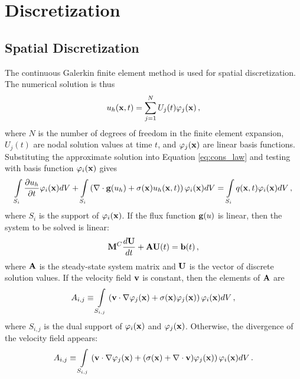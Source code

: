 \section{Discretization}
\subsection{Spatial Discretization}\label{galerkindef}
The continuous Galerkin finite element method is used for spatial discretization.
The numerical solution is thus
\begin{equation}
   u_h(\mathbf{x},t) = \sum\limits_{j=1}^N U_j(t) \varphi_j(\mathbf{x}) \,,
\end{equation}
where $N$ is the number of degrees of freedom in the finite element expansion,
$U_j(t)$ are nodal solution values at time $t$, and $\varphi_j(\mathbf{x})$
are linear basis functions. Substituting the approximate solution into
Equation \eqref{eq:cons_law} and testing
with basis function $\varphi_i(\mathbf{x})$ gives
\begin{equation}
   \int\limits_{S_i}\frac{\partial u_h}{\partial t}\varphi_i(\mathbf{x}) dV
      + \int\limits_{S_i}\left(\nabla\cdot\mathbf{g}(u_h)
      + \sigma(\mathbf{x})u_h(\mathbf{x},t)\right)\varphi_i(\mathbf{x}) dV
      = \int\limits_{S_i} q(\mathbf{x},t) \varphi_i(\mathbf{x}) dV \,,
\end{equation}
where $S_i$ is the support of $\varphi_i(\mathbf{x})$. If the flux function
$\mathbf{g}(u)$ is linear, then the system to be solved is linear:
\begin{equation}\label{semidiscrete}
   \mathbf{M}^C\frac{d\mathbf{U}}{dt}+\mathbf{A} \mathbf{U}(t) = \mathbf{b}(t) \,,
\end{equation}
where $\mathbf{A}$ is the steady-state system matrix and $\mathbf{U}$ is the
vector of discrete solution values. If the velocity field $\mathbf{v}$ is
constant, then the elements of $\mathbf{A}$ are
\begin{equation}\label{Aij}
A_{i,j} \equiv \int\limits_{S_{i,j}}\left(
   \mathbf{v}\cdot\nabla\varphi_j(\mathbf{x}) +
   \sigma(\mathbf{x})\varphi_j(\mathbf{x})\right)\varphi_i(\mathbf{x}) dV \,,
\end{equation}
where $S_{i,j}$ is the dual support of $\varphi_i(\mathbf{x})$ and $\varphi_j(\mathbf{x})$.
Otherwise, the divergence of the velocity field appears:
\begin{equation}\label{eq:Aij_nonconstant_v}
A_{i,j} \equiv \int\limits_{S_{i,j}}\left(
   \mathbf{v}\cdot\nabla\varphi_j(\mathbf{x}) +
   (\sigma(\mathbf{x})+\nabla\cdot\mathbf{v})\varphi_j(\mathbf{x})\right)\varphi_i(\mathbf{x}) dV \,.
\end{equation}
